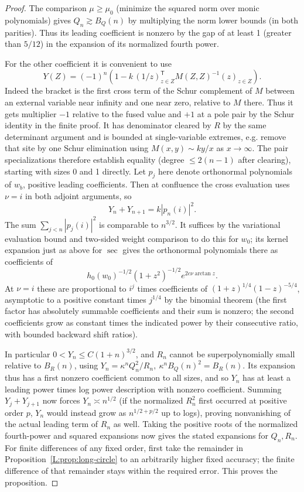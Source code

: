 \begin{proof}
The comparison \(\mu\ge\mu_0\) (minimize the squared norm over monic polynomials) gives \(Q_n\gtrsim B_Q(n)\) by multiplying the norm lower bounds (in both parities). Thus its leading coefficient is nonzero by the gap of at least 1 (greater than \(5/12\)) in the expansion of its normalized fourth power.

For the other coefficient it is convenient to use
\[
 Y(Z)=(-1)^n\left(1-k\,(1/z)_{z\in Z}^{\mathsf T}M(Z,Z)^{-1}(z)_{z\in Z}\right).
\]
Indeed the bracket is the first cross term of the Schur complement of \(M\) between an external variable near infinity and one near zero, relative to \(M\) there. Thus it gets multiplier \(-1\) relative to the fused value and \(+1\) at a pole pair by the Schur identity in the finite proof. It has denominator cleared by \(R\) by the same determinant argument and is bounded at single-variable extremes, e.g. remove that site by one Schur elimination using \(M(x,y)\sim k y/x\) as \(x\to\infty\). The pair specializations therefore establish equality (degree \(\le2(n-1)\) after clearing), starting with sizes 0 and 1 directly. Let \(p_j\) here denote orthonormal polynomials of \(w_b\), positive leading coefficients. Then at confluence the cross evaluation uses \(\nu=i\) in both adjoint arguments, so
\[
 Y_n+Y_{n+1}=k|p_n(i)|^2 .
\]
The sum \(\sum_{j<n}|p_j(i)|^2\) is comparable to \(n^{3/2}\). It suffices by the variational evaluation bound and two-sided weight comparison to do this for \(w_0\); its kernel expansion just as above for \(\sec\) gives the orthonormal polynomials there as coefficients of
\[
 h_0(w_0)^{-1/2} (1+z^2)^{-1/2}e^{2c\nu\arctan z}.
\]
At \(\nu=i\) these are proportional to \(i^j\) times coefficients of \((1+z)^{1/4}(1-z)^{-5/4}\), asymptotic to a positive constant times \(j^{1/4}\) by the binomial theorem (the first factor has absolutely summable coefficients and their sum is nonzero; the second coefficients grow as constant times the indicated power by their consecutive ratio, with bounded backward shift ratios).

In particular \(0<Y_n\le C(1+n)^{3/2}\), and \(R_n\) cannot be superpolynomially small relative to \(B_R(n)\), using \(Y_n=\kappa^n Q_n^2/R_n,\ \kappa^n B_Q(n)^2=B_R(n)\). Its expansion thus has a first nonzero coefficient common to all sizes, and so \(Y_n\) has at least a leading power times log power description with nonzero coefficient. Summing \(Y_j+Y_{j+1}\) now forces \(Y_n\asymp n^{1/2}\) (if the normalized \(R_n^2\) first occurred at positive order \(p\), \(Y_n\) would instead grow as \(n^{1/2+p/2}\) up to logs), proving nonvanishing of the actual leading term of \(R_n\) as well. Taking the positive roots of the normalized fourth-power and squared
expansions now gives the stated expansions for $Q_n,R_n$. For finite
differences of any fixed order, first take the remainder in
Proposition~\ref{L:prop:long-circle} to an arbitrarily higher fixed accuracy;
the finite difference of that remainder stays within the required error.
This proves the proposition.
\end{proof}

